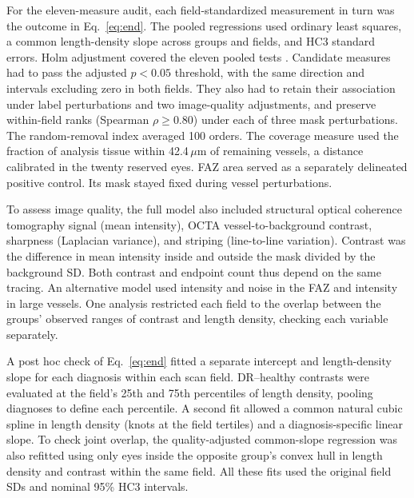 \documentclass[letterpaper]{article}
\begin{document}
For the eleven-measure audit, each field-standardized measurement in turn was the outcome in Eq.~\ref{eq:end}. The pooled regressions used ordinary least squares, a common length-density slope across groups and fields, and HC3 standard errors. Holm adjustment covered the eleven pooled tests \citep{holm1979simple}. Candidate measures had to pass the adjusted $p<0.05$ threshold, with the same direction and intervals excluding zero in both fields. They also had to retain their association under label perturbations and two image-quality adjustments, and preserve within-field ranks (Spearman $\rho\geq0.80$) under each of three mask perturbations. The random-removal index averaged 100 orders. The coverage measure used the fraction of analysis tissue within 42.4\,$\mu$m of remaining vessels, a distance calibrated in the twenty reserved eyes. FAZ area served as a separately delineated positive control. Its mask stayed fixed during vessel perturbations.

To assess image quality, the full model also included structural optical coherence tomography signal (mean intensity), OCTA vessel-to-background contrast, sharpness (Laplacian variance), and striping (line-to-line variation). Contrast was the difference in mean intensity inside and outside the mask divided by the background SD. Both contrast and endpoint count thus depend on the same tracing. An alternative model used intensity and noise in the FAZ and intensity in large vessels. One analysis restricted each field to the overlap between the groups' observed ranges of contrast and length density, checking each variable separately.

A post hoc check of Eq.~\ref{eq:end} fitted a separate intercept and length-density slope for each diagnosis within each scan field. DR--healthy contrasts were evaluated at the field's 25th and 75th percentiles of length density, pooling diagnoses to define each percentile. A second fit allowed a common natural cubic spline in length density (knots at the field tertiles) and a diagnosis-specific linear slope. To check joint overlap, the quality-adjusted common-slope regression was also refitted using only eyes inside the opposite group's convex hull in length density and contrast within the same field. All these fits used the original field SDs and nominal 95\% HC3 intervals.
\end{document}
